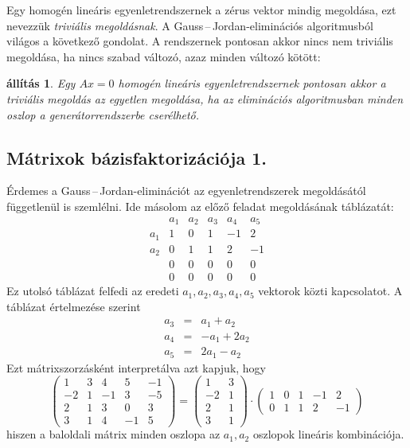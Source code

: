 \documentclass[a4paper, showtrims]{memoir}
\theoremstyle{plain}
\newtheorem{proposition}{állítás}[chapter]
\theoremstyle{remark}
\theoremstyle{definition}
\begin{document}
Egy homogén lineáris egyenletrendszernek a zérus vektor mindig megoldása,
ezt nevezzük \emph{triviális megoldásnak}.
A Gauss\,--\,Jordan-eliminációs  algoritmusból világos a következő gondolat.
A rendszernek pontosan akkor nincs nem triviális megoldása,
ha nincs szabad változó, azaz minden változó kötött:
\begin{proposition}
	Egy $Ax=0$ homogén lineáris egyenletrendszernek pontosan akkor a triviális megoldás az egyetlen megoldása,
	ha az eliminációs algoritmusban minden oszlop a generátorrendszerbe cserélhető.
\end{proposition}
\subsection{Mátrixok bázisfaktorizációja 1.}
Érdemes a Gauss\,--\,Jordan-eliminációt  az egyenletrendszerek megoldásától függetlenül is szemlélni.
Ide másolom az előző feladat megoldásának táblázatát:
\[
	\begin{array}{r|rrrrr}
		    & a_1 & a_2 & a_3 & a_4 & a_5 \\
		\hline
		a_1 & 1   & 0   & 1   & -1  & 2   \\
		a_2 & 0   & 1   & 1   & 2   & -1  \\
		    & 0   & 0   & 0   & 0   & 0   \\
		    & 0   & 0   & 0   & 0   & 0
	\end{array}
\]
Ez utolsó táblázat felfedi az eredeti $a_1,a_2,a_3,a_4,a_5$ vektorok közti kapcsolatot.
A táblázat értelmezése szerint
\begin{eqnarray*}
	a_3&=& a_1+a_2\\
	a_4&=& -a_1+2a_2\\
	a_5&=& 2a_1-a_2
\end{eqnarray*}
Ezt mátrixszorzásként interpretálva azt kapjuk, hogy
\[
	\begin{pmatrix}
		1  & 3 & 4  & 5  & -1 \\
		-2 & 1 & -1 & 3  & -5 \\
		2  & 1 & 3  & 0  & 3  \\
		3  & 1 & 4  & -1 & 5
	\end{pmatrix}
	=
	\begin{pmatrix}
		1  & 3 \\
		-2 & 1 \\
		2  & 1 \\
		3  & 1
	\end{pmatrix}
	\cdot
	\begin{pmatrix}
		1 & 0 & 1 & -1 & 2  \\
		0 & 1 & 1 & 2  & -1
	\end{pmatrix}
    \tag{\dag}\label{bazisfakt}
\]
hiszen a baloldali mátrix minden oszlopa az $a_1,a_2$ oszlopok lineáris kombinációja.
\end{document}
